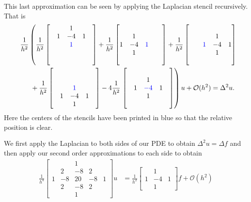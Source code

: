 \documentclass[12pt]{article}
\begin{document}
This last approximation can be seen by applying the Laplacian stencil recursively. That is
\begin{align*}
	\phantom{=}& \frac{1}{h^2}\left( \frac{1}{h^2}\begin{bmatrix}&&1&&\\&1&-4&1&\\&&\color{blue}1&&\\&&&&\\&&&&\end{bmatrix} +
	\frac{1}{h^2}\begin{bmatrix}&&&&\\&1&&&\\1&-4&\color{blue}1&&\\&1&&&\\&&&&\end{bmatrix} +
	\frac{1}{h^2}\begin{bmatrix}&&&&\\&&&1&\\&&\color{blue}1&-4&1\\&&&1&\\&&&&\end{bmatrix} \right.\\
	& \phantom{==}+
	\frac{1}{h^2}\begin{bmatrix}&&&&\\&&&&\\&&\color{blue}1&&\\&1&-4&1&\\&&1&&\end{bmatrix} 
	-4 \frac{1}{h^2} 
	\left. \begin{bmatrix}&&&&\\&&1&&\\&1&\color{blue}-4&1&\\&&1&&\\&&&&\end{bmatrix}
	\right)u + \mathcal{O}(h^2)= \Delta^2 u.
\end{align*}
Here the centers of the stencils have been printed in {\color{blue}blue} so that the relative position is clear. \bigbreak

We first apply the Laplacian to both sides of our PDE to obtain $\Delta^2 u = \Delta f$ and then apply our second order approximations to each side to obtain
\begin{align}
	\frac{1}{h^4}\begin{bmatrix}&&1&&\\&2&-8&2&\\1&-8&20&-8&1\\&2&-8&2&\\&&1&&\end{bmatrix}u & = 
	\frac{1}{h^2}\begin{bmatrix}&1&\\1&-4&1\\&1&\end{bmatrix}f + \mathcal{O}(h^2) \label{secondOrder}
\end{align}
\end{document}
